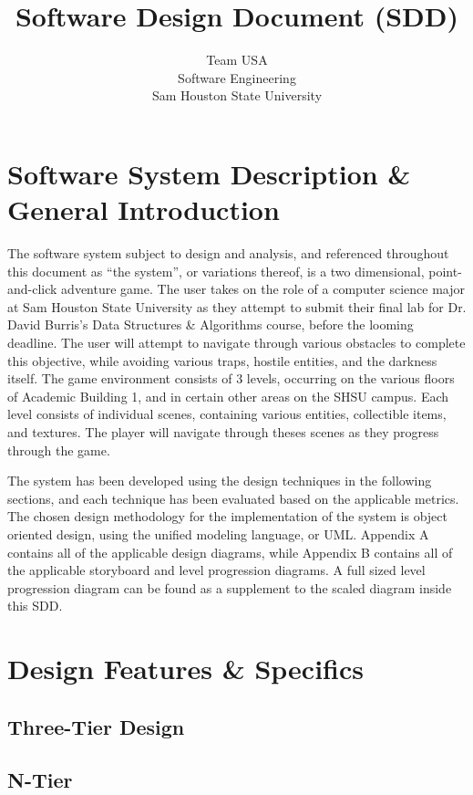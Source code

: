 \documentclass{article}
\title{Software Design Document (SDD)}
\author{Team USA \\ Software Engineering \\ Sam Houston State University}
\begin{document}
\maketitle
\newpage

\tableofcontents
\newpage

%
%
\section{Software System Description \& General Introduction}
The software system subject to design and analysis, and referenced throughout this document as ``the system'', or variations thereof, is a two dimensional, point-and-click adventure game. The user takes on the role of a computer science major at Sam Houston State University as they attempt to submit their final lab for Dr. David Burris's Data Structures \& Algorithms course, before the looming deadline. The user will attempt to navigate through various obstacles to complete this objective, while avoiding various traps, hostile entities, and the darkness itself. The game environment consists of 3 levels, occurring on the various floors of Academic Building 1, and in certain other areas on the SHSU campus. Each level consists of individual scenes, containing various entities, collectible items, and textures. The player will navigate through theses scenes as they progress through the game. 

The system has been developed using the design techniques in the following sections, and each technique has been evaluated based on the applicable metrics. The chosen design methodology for the implementation of the system is object oriented design, using the unified modeling language, or UML. Appendix A contains all of the applicable design diagrams, while Appendix B contains all of the applicable storyboard and level progression diagrams. A full sized level progression diagram can be found as a supplement to the scaled diagram inside this SDD. 
%
%
\section{Design Features \& Specifics}
	\subsection{Three-Tier Design}
	\subsection{N-Tier}
\end{document}
